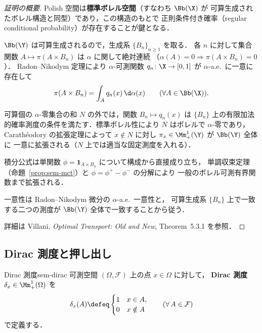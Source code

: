 \begin{proof}[証明の概要]
  Polish 空間は\textbf{標準ボレル空間}（すなわち $\Bb(\X)$ が
  可算生成されたボレル構造と同型）であり，この構造のもとで
  正則条件付き確率（regular conditional probability）が存在することが鍵となる．

  $\Bb(\Y)$ は可算生成されるので，生成系 $\{B_n\}_{n \geq 1}$ を取る．
  各 $n$ に対して集合関数 $A \mapsto \pi(A \times B_n)$ は $\alpha$ に関して絶対連続
  （$\alpha(A) = 0 \Rightarrow \pi(A \times B_n) = 0$）．
  Radon--Nikodym 定理により $\alpha$-可測関数
  $q_n \colon \X \to [0, 1]$ が $\alpha$-a.e.\ に一意に存在して
  \[
    \pi(A \times B_n) = \int_A q_n(x) \, \d\alpha(x) \qquad (\forall A \in \Bb(\X)).
  \]

  可算個の $\alpha$-零集合の和 $N$ の外では，関数 $B_n \mapsto q_n(x)$ は
  $\{B_n\}$ 上の有限加法的確率測度の条件を満たす．標準ボレル性により
  $N$ はボレルで $\alpha$-零であり，Carathéodory の拡張定理によって
  $x \notin N$ に対し $\pi_x \in \Mm_+^1(\Y)$ が $\Bb(\Y)$ 全体に
  一意に拡張される（$N$ 上では適当な固定測度を入れる）．

  積分公式は単関数 $\phi = \mathbf{1}_{A \times B_n}$ について構成から直接成り立ち，
  単調収束定理（命題~\ref{prop:sem-mct}）と $\phi = \phi^+ - \phi^-$ の分解により
  一般のボレル可測有界関数まで拡張される．

  一意性は Radon--Nikodym 微分の $\alpha$-a.e.\ 一意性と，
  可算生成系 $\{B_n\}$ 上で一致する二つの測度が
  $\Bb(\Y)$ 全体で一致することから従う．

  詳細は Villani, \textit{Optimal Transport: Old and New},
  Theorem~5.3.1 を参照．
\end{proof}

\subsection{Dirac 測度と押し出し}
\label{sec:sem-dirac-pushforward}

\begin{definition}{Dirac 測度}{sem-dirac}
  可測空間 $(\Omega, \mathcal{F})$ 上の点 $x \in \Omega$ に対して，
  \textbf{Dirac 測度} $\delta_x \in \Mm_+^1(\Omega)$ を
  \[
    \delta_x(A) \defeq
    \begin{cases}
      1 & x \in A, \\
      0 & x \notin A
    \end{cases}
    \qquad (\forall\, A \in \mathcal{F})
  \]
  で定義する．
\end{definition}

